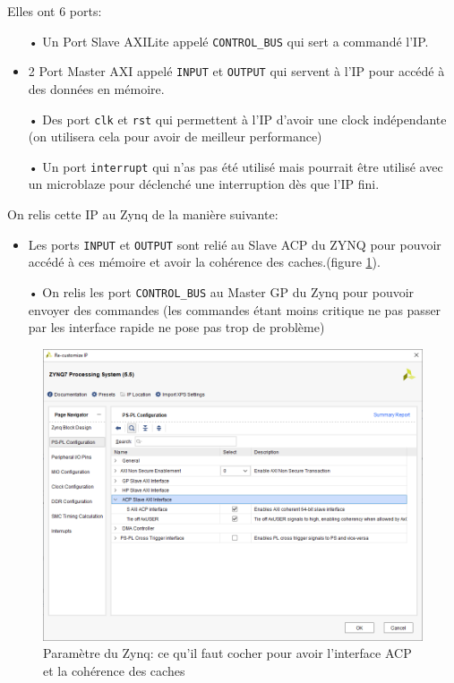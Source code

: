 \documentclass[12pt,a4paper]{article}
\begin{document}
Elles ont 6 ports: \begin{itemize}
\item[•]Un Port Slave AXILite appelé \lstinline[language=bash]{CONTROL_BUS} qui sert a commandé l'IP.
\item[•]2 Port Master AXI appelé \lstinline[language=bash]{INPUT} et \lstinline[language=bash]{OUTPUT} qui servent à l'IP pour accédé à des données en mémoire.
\item[•] Des port \lstinline[language=bash]{clk} et \lstinline[language=bash]{rst} qui permettent à l'IP d'avoir une clock indépendante (on utilisera cela pour avoir de meilleur performance)
\item[•]Un port \lstinline[language=bash]{interrupt} qui n'as pas été utilisé mais pourrait être utilisé avec un microblaze pour déclenché une interruption dès que l'IP fini.

\end{itemize}

On relis cette IP au Zynq de la manière suivante:\begin{itemize}
\item[•]Les ports \lstinline[language=bash]{INPUT} et \lstinline[language=bash]{OUTPUT} sont relié au Slave ACP du ZYNQ pour pouvoir accédé à ces mémoire et avoir la cohérence des caches.(figure \ref{fig-acp}).
\item[•] On relis les port \lstinline[language=bash]{CONTROL_BUS} au Master GP du Zynq pour pouvoir envoyer des commandes (les commandes étant moins critique ne pas passer par les interface rapide ne pose pas trop de problème)
\end{itemize}


\begin{figure}[H]
	\centering
		\includegraphics[width=\linewidth]{im/ip2.png}	
	\caption{Paramètre du Zynq: ce qu'il faut cocher pour avoir l'interface ACP et la cohérence des caches}
	\label{fig-acp}
\end{figure}
\end{document}
